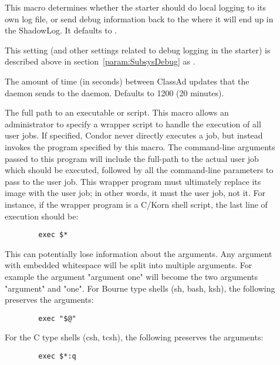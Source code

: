 \begin{description}
\item[]
  \label{param:StarterLocalLogging} This macro determines whether the
  starter should do local logging to its own log file, or send debug
  information back to the  where it will end up in the
  ShadowLog.  It defaults to .

\item[] \label{param:StarterDebug} This setting
  (and other settings related to debug logging in the starter) is
  described above in section~\ref{param:SubsysDebug} as
  .

\item[] \label{param:StarterUpdateInterval}
The amount of time (in seconds) between ClassAd updates that the
 daemon sends to the  daemon.
Defaults to 1200 (20 minutes).

\item[] \label{param:UserJobWrapper} 
  The full path to an executable or script.
  This macro
  allows an administrator to specify a wrapper script to handle the
  execution of all user jobs.  
  If specified, Condor never directly executes a job, but instead
  invokes the program specified by this macro.
  The command-line arguments passed to this program will include the
  full-path to the actual user job which should be executed, followed by all
  the command-line parameters to pass to the user job.
  This wrapper program must ultimately replace its image with the user job;
  in other words,
  it must  the user job, not  it.
  For instance, if the wrapper program is a C/Korn shell script, the
  last line of execution should be:
\begin{verbatim}
        exec $*
\end{verbatim}
  This can potentially lose information about the arguments.
  Any argument with embedded whitespace will be split into multiple
  arguments.
  For example the argument "argument one" will become the two arguments
  "argument" and "one".
  For Bourne type shells (sh, bash, ksh),
  the following preserves the arguments:
\begin{verbatim}
        exec "$@"
\end{verbatim}
  For the C type shells (csh, tcsh), the following preserves the
  arguments:
\begin{verbatim}
        exec $*:q
\end{verbatim}



\end{description}

